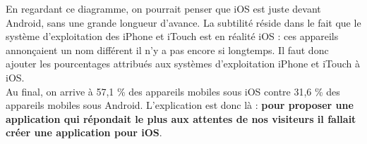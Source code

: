 \documentclass{report}
\begin{document}
	En regardant ce diagramme, on pourrait penser que iOS est juste devant Android, sans une grande longueur d'avance. La subtilité réside dans le fait que le système d'exploitation des iPhone et iTouch est en réalité iOS : ces appareils annonçaient un nom différent il n'y a pas encore si longtemps. Il faut donc ajouter les pourcentages attribués aux systèmes d'exploitation iPhone et iTouch à iOS.\\

	Au final, on arrive à 57,1 \% des appareils mobiles sous iOS contre 31,6 \% des appareils mobiles sous Android. L'explication est donc là : \textbf{pour proposer une application qui répondait le plus aux attentes de nos visiteurs il fallait créer une application pour iOS}.
\end{document}
